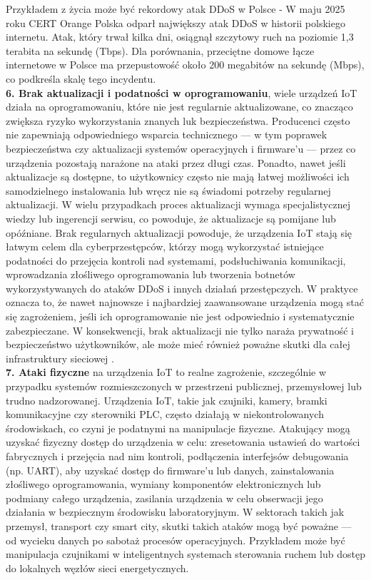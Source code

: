 Przykładem z życia może być rekordowy atak DDoS w Polsce - W maju 2025 roku CERT Orange Polska odparł największy atak DDoS w historii polskiego internetu. Atak, który trwał kilka dni, osiągnął szczytowy ruch na poziomie 1,3 terabita na sekundę (Tbps). Dla porównania, przeciętne domowe łącze internetowe w Polsce ma przepustowość około 200 megabitów na sekundę (Mbps), co podkreśla skalę tego incydentu. \cite{certorange2025}
\vspace{10pt} \\
\textbf{6. Brak aktualizacji i podatności w oprogramowaniu}, wiele urządzeń IoT działa na oprogramowaniu, które nie jest regularnie aktualizowane, co znacząco zwiększa ryzyko wykorzystania znanych luk bezpieczeństwa. Producenci często nie zapewniają odpowiedniego wsparcia technicznego — w tym poprawek bezpieczeństwa czy aktualizacji systemów operacyjnych i firmware’u — przez co urządzenia pozostają narażone na ataki przez długi czas. Ponadto, nawet jeśli aktualizacje są dostępne, to użytkownicy często nie mają łatwej możliwości ich samodzielnego instalowania lub wręcz nie są świadomi potrzeby regularnej aktualizacji. W wielu przypadkach proces aktualizacji wymaga specjalistycznej wiedzy lub ingerencji serwisu, co powoduje, że aktualizacje są pomijane lub opóźniane. Brak regularnych aktualizacji powoduje, że urządzenia IoT stają się łatwym celem dla cyberprzestępców, którzy mogą wykorzystać istniejące podatności do przejęcia kontroli nad systemami, podsłuchiwania komunikacji, wprowadzania złośliwego oprogramowania lub tworzenia botnetów wykorzystywanych do ataków DDoS i innych działań przestępczych. W praktyce oznacza to, że nawet najnowsze i najbardziej zaawansowane urządzenia mogą stać się zagrożeniem, jeśli ich oprogramowanie nie jest odpowiednio i systematycznie zabezpieczane. W konsekwencji, brak aktualizacji nie tylko naraża prywatność i bezpieczeństwo użytkowników, ale może mieć również poważne skutki dla całej infrastruktury sieciowej \cite{johnston2019}.
\vspace{10pt} \\
\textbf{7. Ataki fizyczne} na urządzenia IoT to realne zagrożenie, szczególnie w przypadku systemów rozmieszczonych w przestrzeni publicznej, przemysłowej lub trudno nadzorowanej. Urządzenia IoT, takie jak czujniki, kamery, bramki komunikacyjne czy sterowniki PLC, często działają w niekontrolowanych środowiskach, co czyni je podatnymi na manipulacje fizyczne. Atakujący mogą uzyskać fizyczny dostęp do urządzenia w celu: zresetowania ustawień do wartości fabrycznych i przejęcia nad nim kontroli, podłączenia interfejsów debugowania (np. UART), aby uzyskać dostęp do firmware'u lub danych, zainstalowania złośliwego oprogramowania, wymiany komponentów elektronicznych lub podmiany całego urządzenia, zasilania urządzenia w celu obserwacji jego działania w bezpiecznym środowisku laboratoryjnym. W sektorach takich jak przemysł, transport czy smart city, skutki takich ataków mogą być poważne — od wycieku danych po sabotaż procesów operacyjnych. Przykładem może być manipulacja czujnikami w inteligentnych systemach sterowania ruchem lub dostęp do lokalnych węzłów sieci energetycznych. 
